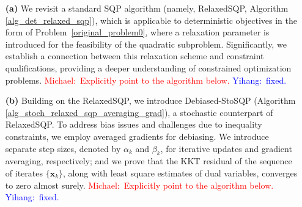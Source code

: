 \documentclass[aos]{imsart}
\numberwithin{equation}{section}
\theoremstyle{plain}
\newcommand{\michael}[1]{\textcolor{red}{Michael:\ #1}}
\newcommand{\yihang}[1]{\textcolor{blue}{Yihang:\ #1}}
\begin{document}
\begin{enumerate}
    \item[\textbf{(a)}] We revisit a standard SQP algorithm (namely, RelaxedSQP, Algorithm \ref{alg_det_relaxed_sqp}), which is applicable to deterministic objectives in the form of Problem~\eqref{original_problem0}, where a relaxation parameter is introduced for the feasibility of the quadratic subproblem. Significantly, we establish a connection between this relaxation scheme and constraint qualifications, providing a deeper understanding of constrained optimization problems.
\michael{Explicitly point to the algorithm below.} \yihang{fixed.}
    

    \item[\textbf{(b)}] Building on the RelaxedSQP, we introduce Debiased-StoSQP (Algorithm \ref{alg_stoch_relaxed_sqp_averaging_grad}), a stochastic counterpart of RelaxedSQP.
    To address bias issues and challenges due to inequality constraints, we employ averaged gradients for debiasing. 
    We introduce separate step sizes, denoted by  $\alpha_k$ and $\beta_k$, for iterative updates and gradient averaging, respectively; and we prove that the KKT residual of the sequence of iterates  $\{\bm{x}_k\}$, along with least square estimates of dual variables, converges to zero almost surely. \michael{Explicitly point to the algorithm below.} \yihang{fixed.}


\end{enumerate}
\end{document}
